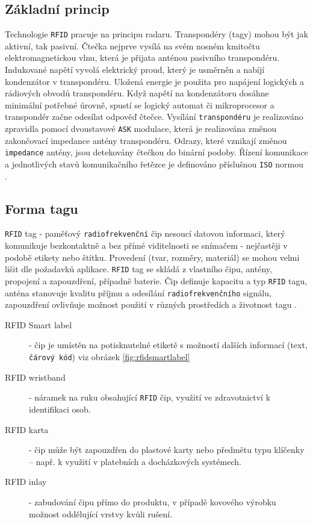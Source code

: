 \documentclass[czech,BP]{thesiskiv}
\begin{document}
\subsection{Základní princip}
Technologie \texttt{RFID} pracuje na principu radaru. Transpondéry (tagy) mohou být jak aktivní, tak pasivní. Čtečka nejprve vysílá na svém nosném kmitočtu elektromagnetickou vlnu, která je přijata anténou pasivního transpondéru. Indukované napětí vyvolá elektrický proud, který je usměrněn a nabíjí kondenzátor v transpondéru. Uložená energie je použita pro napájení logických a rádiových obvodů transpondéru. Když napětí na kondenzátoru dosáhne minimální potřebné úrovně, spustí se logický automat či mikroprocesor a transpondér začne odesílat odpověď čtečce. Vysílání \texttt{transpondéru} je realizováno zpravidla pomocí dvoustavové \texttt{ASK} modulace, která je realizována změnou zakončovací impedance antény transpondéru. Odrazy, které vznikají změnou \texttt{impedance} antény, jsou detekovány čtečkou do binární podoby. Řízení komunikace a jednotlivých stavů komunikačního řetězce je definováno příslušnou \texttt{ISO} normou \cite{dolevcek2010identifikace}.


\subsection{Forma tagu}
\texttt{RFID} tag - paměťový \texttt{radiofrekvenční} čip nesoucí datovou informaci, který komunikuje bezkontaktně a bez přímé viditelnosti se snímačem - nejčastěji v podobě etikety nebo štítku. Provedení (tvar, rozměry, materiál) se mohou velmi lišit dle požadavků aplikace. \texttt{RFID} tag se skládá z vlastního čipu, antény, propojení a zapouzdření, případně baterie. Čip definuje kapacitu a typ \texttt{RFID} tagu, anténa stanovuje kvalitu příjmu a odesílání \texttt{radiofrekvenčního} signálu, zapouzdření ovlivňuje možnost použití v různých prostředích a životnost tagu \cite{dolevcek2010identifikace}.

\newpage
\begin{description}
\item [RFID Smart label]
- čip je umístěn na potisknutelné etiketě s možností dalších informací (text, \texttt{čárový kód}) viz obrázek \ref{fig:rfidsmartlabel}
\item [RFID wristband] - náramek na ruku obsahující \texttt{RFID} čip,  využití ve zdravotnictví k identifikaci osob.
\item [RFID karta] - čip může být zapouzdřen do plastové karty nebo předmětu typu klíčenky – např. k využití v platebních a docházkových systémech.
\item [RFID inlay] - zabudování čipu přímo do produktu, v případě kovového výrobku možnost oddělující vrstvy kvůli rušení.
\end{description}
\end{document}
